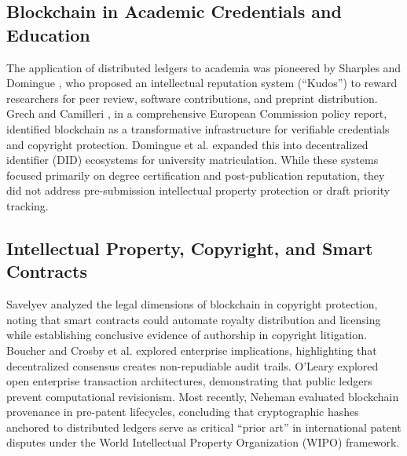 \documentclass[conference]{IEEEtran}
\begin{document}
\subsection{Blockchain in Academic Credentials and Education}
The application of distributed ledgers to academia was pioneered by Sharples and Domingue \cite{sharples2016blockchain}, who proposed an intellectual reputation system (``Kudos'') to reward researchers for peer review, software contributions, and preprint distribution. Grech and Camilleri \cite{grech2017education}, in a comprehensive European Commission policy report, identified blockchain as a transformative infrastructure for verifiable credentials and copyright protection. Domingue et al. \cite{domingue2019credentials} expanded this into decentralized identifier (DID) ecosystems for university matriculation. While these systems focused primarily on degree certification and post-publication reputation, they did not address pre-submission intellectual property protection or draft priority tracking.

\subsection{Intellectual Property, Copyright, and Smart Contracts}
Savelyev \cite{savelyev2018copyright} analyzed the legal dimensions of blockchain in copyright protection, noting that smart contracts \cite{wang2018smartcontracts} could automate royalty distribution and licensing while establishing conclusive evidence of authorship in copyright litigation. Boucher \cite{boucher2017blockchain} and Crosby et al. \cite{crosby2016beyondbitcoin} explored enterprise implications, highlighting that decentralized consensus creates non-repudiable audit trails. O'Leary \cite{oleary2017openinformation} explored open enterprise transaction architectures, demonstrating that public ledgers prevent computational revisionism. Most recently, Neheman \cite{neheman2023provenance} evaluated blockchain provenance in pre-patent lifecycles, concluding that cryptographic hashes anchored to distributed ledgers serve as critical ``prior art'' in international patent disputes under the World Intellectual Property Organization (WIPO) framework.
\end{document}
